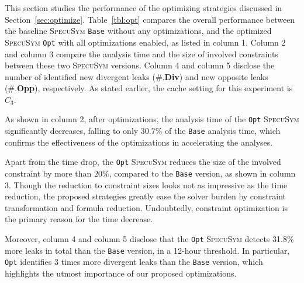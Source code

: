 \documentclass[sigconf]{acmart}
\newcommand{\SpecuSym}{\textsc{SpecuSym} }
\begin{document}
This section studies the performance of the optimizing strategies discussed in 
Section~\ref{sec:optimize}. Table~\ref{tbl:opt} compares the overall performance 
between the baseline \SpecuSym \texttt{Base} without any optimizations, and the
optimized \SpecuSym \texttt{Opt} with all optimizations enabled, as listed in 
column 1. Column 2 and column 3 compare the analysis time and the size of involved 
constraints between these two \SpecuSym versions. Column 4 and column 5 disclose 
the number of identified new divergent leaks (\#.\textbf{Div}) and new opposite 
leaks (\#.\textbf{Opp}), respectively. As stated earlier, the cache setting for 
this experiment is $C_3$.


As shown in column 2, after optimizations, the analysis time of the \texttt{Opt} 
\SpecuSym significantly decreases, falling to only $30.7\%$ of the \texttt{Base} 
analysis time, which confirms the effectiveness of the optimizations in 
accelerating the analyses. 


Apart from the time drop, the \texttt{Opt} \SpecuSym reduces the size of the 
involved constraint by more than $20\%$, compared to the \texttt{Base} version, 
as shown in column 3. Though the reduction to constraint sizes looks not as 
impressive as the time reduction, the proposed strategies greatly ease the solver 
burden by constraint transformation and formula reduction. Undoubtedly, constraint 
optimization is the primary reason for the time decrease.


Moreover, column 4 and column 5 disclose that the \texttt{Opt} \SpecuSym 
detects 31.8\% more leaks in total than the \texttt{Base} version, in a 
12-hour threshold. In particular, \texttt{Opt} identifies 3 times more 
divergent leaks than the \texttt{Base} version, which highlights the utmost 
importance of our proposed optimizations. 
\end{document}
